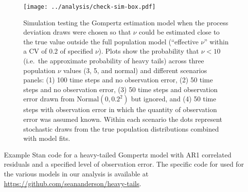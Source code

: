 \begin{figure}[htbp]
\begin{center}
\texttt{[image: ../analysis/check-sim-box.pdf]}
\caption{
Simulation testing the Gompertz estimation model when the process deviation
draws were chosen so that $\nu$ could be estimated close to the true value
outside the full population model (``effective $\nu$'' within a CV of 0.2 of
specified $\nu$).
Plots show the probability that $\nu < 10$ (i.e.\ the approximate probability
of heavy tails) across three population $\nu$ values
(3, 5, and normal) and different scenarios panels: (1) 100 time steps and no
observation error, (2) 50 time steps and no observation error, (3) 50 time
steps and observation error drawn from $\mathrm{Normal} (0, 0.2^2)$ but
ignored, and (4) 50 time steps with observation error in which the quantity
of observation error was assumed known.
Within
each scenario the dots represent stochastic draws from the true population
distributions combined with model fits.
}
\label{fig:sim-prob}
\end{center}
\end{figure}

\clearpage

\noindent
Example Stan code for a heavy-tailed Gompertz model with AR1 correlated
residuals and a specified level of observation error. The specific code for used for the various models in our analysis is available at \url{https://github.com/seananderson/heavy-tails}.

